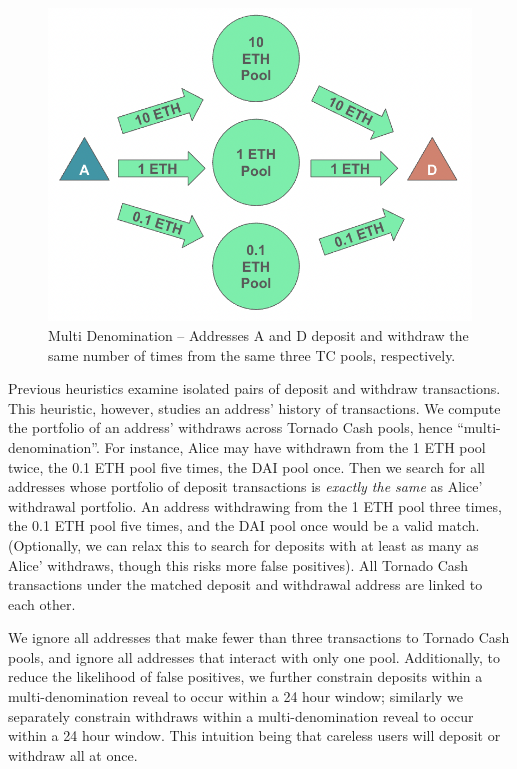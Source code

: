 \begin{figure}[h!]
\centering
\includegraphics[width=0.6\linewidth]{figures/tcash/h4.png}
\caption{Multi Denomination -- Addresses A and D deposit and withdraw the same number of times from the same three TC pools, respectively.}
\label{fig:tornado}
\end{figure}

Previous heuristics examine isolated pairs of deposit and withdraw transactions. This heuristic, however, studies an address' history of transactions. We compute the portfolio of an address' withdraws across Tornado Cash pools, hence ``multi-denomination''. For instance, Alice may have withdrawn from the 1 ETH pool twice, the 0.1 ETH pool five times, the DAI pool once. Then we search for all addresses whose portfolio of deposit transactions is \textit{exactly the same} as Alice' withdrawal portfolio. An address withdrawing from the 1 ETH pool three times, the 0.1 ETH pool five times, and the DAI pool once would be a valid match. (Optionally, we can relax this to search for deposits with at least as many as Alice' withdraws, though this risks more false positives). All Tornado Cash transactions under the matched deposit and withdrawal address are linked to each other.

We ignore all addresses that make fewer than three transactions to Tornado Cash pools, and ignore all addresses that interact with only one pool. Additionally, to reduce the likelihood of false positives, we further constrain deposits within a multi-denomination reveal to occur within a 24 hour window; similarly we separately constrain withdraws within a multi-denomination reveal to occur within a 24 hour window. This intuition being that careless users will deposit or withdraw all at once.

